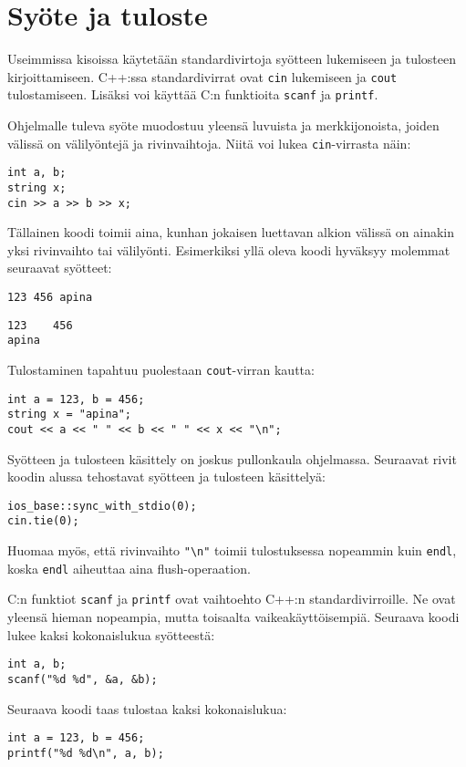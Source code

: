 \section{Syöte ja tuloste}


Useimmissa kisoissa käytetään
standardivirtoja syötteen lukemiseen ja tulosteen
kirjoittamiseen.
C++:ssa standardivirrat ovat \texttt{cin}
lukemiseen
ja \texttt{cout} tulostamiseen. Lisäksi voi käyttää
C:n funktioita \texttt{scanf} ja \texttt{printf}.

Ohjelmalle tuleva syöte muodostuu yleensä
luvuista ja merkkijonoista,
joiden välissä on välilyöntejä ja rivinvaihtoja.
Niitä voi lukea \texttt{cin}-virrasta näin:

\begin{lstlisting}
int a, b;
string x;
cin >> a >> b >> x;
\end{lstlisting}

Tällainen koodi toimii aina,
kunhan jokaisen luettavan alkion välissä
on ainakin yksi rivinvaihto tai välilyönti.
Esimerkiksi yllä oleva koodi hyväksyy
molemmat seuraavat syötteet:
\begin{lstlisting}
123 456 apina
\end{lstlisting}
\begin{lstlisting}
123    456
apina
\end{lstlisting}
Tulostaminen tapahtuu puolestaan
\texttt{cout}-virran kautta:
\begin{lstlisting}
int a = 123, b = 456;
string x = "apina";
cout << a << " " << b << " " << x << "\n";
\end{lstlisting}

Syötteen ja tulosteen käsittely on joskus
pullonkaula ohjelmassa.
Seuraavat rivit koodin alussa tehostavat
syötteen ja tulosteen käsittelyä:

\begin{lstlisting}
ios_base::sync_with_stdio(0);
cin.tie(0);
\end{lstlisting}

Huomaa myös, että rivinvaihto \texttt{"\textbackslash n"}
toimii tulostuksessa nopeammin kuin \texttt{endl},
koska \texttt{endl} aiheuttaa
aina flush-operaation.

C:n funktiot \texttt{scanf}
ja \texttt{printf} ovat vaihtoehto
C++:n standardivirroille.
Ne ovat yleensä hieman nopeampia,
mutta toisaalta vaikeakäyttöisempiä.
Seuraava koodi lukee kaksi kokonaislukua syötteestä:
\begin{lstlisting}
int a, b;
scanf("%d %d", &a, &b);
\end{lstlisting}
Seuraava koodi taas tulostaa kaksi kokonaislukua:
\begin{lstlisting}
int a = 123, b = 456;
printf("%d %d\n", a, b);
\end{lstlisting}

